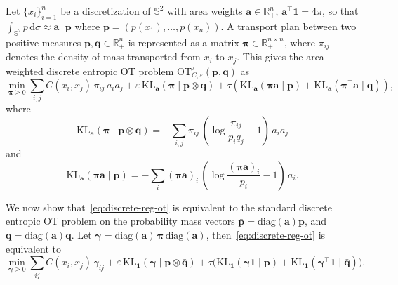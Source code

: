 \documentclass{article}
\theoremstyle{plain}
\theoremstyle{definition}
\theoremstyle{remark}
\renewcommand{\S}{\ensuremath{\mathbb{S}}}
\renewcommand{\vector}[1]{\mathrm{\mathbf{#1}}}
\begin{document}
Let $\{x_i\}_{i=1}^n$ be a discretization of $\S^2$ with area weights
$\vector{a} \in \mathbb{R}^n_+$, $\vector{a}^\top \mathbf{1} = 4\pi$, so that
$\int_{\S^2} p\,\mathrm{d}\sigma \approx \vector{a}^\top \vector{p}$ where $\vector{p}=(p(x_1), \ldots, p(x_n))$.
A transport plan between two positive measures $\vector{p}, \vector{q} \in \mathbb{R}^n_+$
is represented as a matrix $\bm{\pi} \in \mathbb{R}^{n \times n}_+$, where $\pi_{ij}$
denotes the density of mass transported from $x_i$ to $x_j$.
This gives the area-weighted discrete entropic OT problem $\mathrm{OT}_{C,\varepsilon}^\tau(\vector{p}, \vector{q})$ as
\begin{equation}
\label{eq:discrete-reg-ot}
\min_{\bm{\pi} \geq 0}
\sum_{i,j} C(x_i, x_j)\,\pi_{ij}\,a_i a_j
+ \varepsilon\, \textrm{KL}_{\vector{a}}(\bm{\pi} \mid \vector{p} \otimes \vector{q}) + \tau \left( \textrm{KL}_{\vector{a}}(\bm{\pi} \vector{a} \mid \vector{p})
  + \textrm{KL}_{\vector{a}}(\bm{\pi}^\top \vector{a}\mid \vector{q})\right),
\end{equation}
where
\[
 \textrm{KL}_{\vector{a}}(\bm{\pi} \mid \vector{p} \otimes \vector{q}) = -\sum_{i,j} \pi_{ij}\,\left(\log \frac{\pi_{ij}}{p_iq_j} - 1\right)\,a_i a_j
\]
and
\[
 \textrm{KL}_{\vector{a}}(\bm{\pi} \vector{a} \mid \vector{p}) = -\sum_i (\bm{\pi}\vector{a})_i\,\left(\log \frac{(\bm{\pi}\vector{a})_i}{p_i} - 1\right)\,a_i.
\]

We now show that~\eqref{eq:discrete-reg-ot} is equivalent to the standard discrete
entropic OT problem on the probability mass vectors
$\bar{\vector{p}} = \mathrm{diag}(\vector{a})\vector{p}$, and
$\bar{\vector{q}} = \mathrm{diag}(\vector{a})\vector{q}$. Let $\bm{\gamma} = \mathrm{diag}(\vector{a})\,\bm{\pi}\,\mathrm{diag}(\vector{a})$, then~\eqref{eq:discrete-reg-ot} is equivalent to
\begin{equation}
\label{eq:discrete-reg-ot-unbalanced-standard}
\min_{\bm{\gamma} \geq 0}
\sum_{ij} C(x_i, x_j)\,\gamma_{ij}
+ \varepsilon\,\mathrm{KL}_{\mathbf{1}}(\bm{\gamma} \mid \bar{\vector{p}} \otimes \bar{\vector{q}})
+ \tau\bigl(\mathrm{KL}_{\mathbf{1}}(\bm{\gamma}\mathbf{1} \mid \bar{\vector{p}})
           + \mathrm{KL}_{\mathbf{1}}(\bm{\gamma}^\top\mathbf{1} \mid \bar{\vector{q}})\bigr).
\end{equation}
\end{document}
